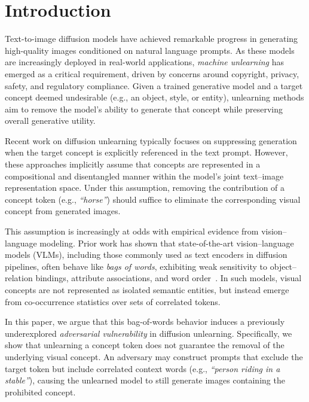 \section{Introduction}
\label{sec:intro}

Text-to-image diffusion models have achieved remarkable progress in generating high-quality images conditioned on natural language prompts. As these models are increasingly deployed in real-world applications, \emph{machine unlearning} has emerged as a critical requirement, driven by concerns around copyright, privacy, safety, and regulatory compliance. Given a trained generative model and a target concept deemed undesirable (e.g., an object, style, or entity), unlearning methods aim to remove the model’s ability to generate that concept while preserving overall generative utility.

Recent work on diffusion unlearning typically focuses on suppressing generation when the target concept is explicitly referenced in the text prompt. However, these approaches implicitly assume that concepts are represented in a compositional and disentangled manner within the model’s joint text--image representation space. Under this assumption, removing the contribution of a concept token (e.g., \emph{``horse''}) should suffice to eliminate the corresponding visual concept from generated images.

This assumption is increasingly at odds with empirical evidence from vision--language modeling. Prior work has shown that state-of-the-art vision--language models (VLMs), including those commonly used as text encoders in diffusion pipelines, often behave like \emph{bags of words}, exhibiting weak sensitivity to object--relation bindings, attribute associations, and word order~\cite{yuksekgonul2022and}. In such models, visual concepts are not represented as isolated semantic entities, but instead emerge from co-occurrence statistics over sets of correlated tokens.


In this paper, we argue that this bag-of-words behavior induces a previously underexplored \emph{adversarial vulnerability} in diffusion unlearning. Specifically, we show that unlearning a concept token does not guarantee the removal of the underlying visual concept. An adversary may construct prompts that exclude the target token but include correlated context words (e.g., \emph{``person riding in a stable''}), causing the unlearned model to still generate images containing the prohibited concept.


